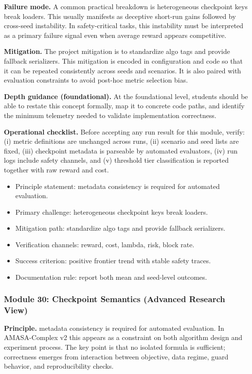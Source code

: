 \documentclass[conference]{IEEEtran}
\begin{document}
\textbf{Failure mode.} A common practical breakdown is heterogeneous checkpoint keys break loaders. This usually manifests as deceptive short-run gains followed by cross-seed instability. In safety-critical tasks, this instability must be interpreted as a primary failure signal even when average reward appears competitive.

\textbf{Mitigation.} The project mitigation is to standardize algo tags and provide fallback serializers. This mitigation is encoded in configuration and code so that it can be repeated consistently across seeds and scenarios. It is also paired with evaluation constraints to avoid post-hoc metric selection bias.

\textbf{Depth guidance (foundational).} At the foundational level, students should be able to restate this concept formally, map it to concrete code paths, and identify the minimum telemetry needed to validate implementation correctness.

\textbf{Operational checklist.} Before accepting any run result for this module, verify: (i) metric definitions are unchanged across runs, (ii) scenario and seed lists are fixed, (iii) checkpoint metadata is parseable by automated evaluators, (iv) run logs include safety channels, and (v) threshold tier classification is reported together with raw reward and cost.

\begin{itemize}[leftmargin=*]
  \item Principle statement: metadata consistency is required for automated evaluation.
  \item Primary challenge: heterogeneous checkpoint keys break loaders.
  \item Mitigation path: standardize algo tags and provide fallback serializers.
  \item Verification channels: reward, cost, lambda, risk, block rate.
  \item Success criterion: positive frontier trend with stable safety traces.
  \item Documentation rule: report both mean and seed-level outcomes.
\end{itemize}


\subsubsection{Module 30: Checkpoint Semantics (Advanced Research View)}
\textbf{Principle.} metadata consistency is required for automated evaluation. In AMASA-Complex v2 this appears as a constraint on both algorithm design and experiment process. The key point is that no isolated formula is sufficient; correctness emerges from interaction between objective, data regime, guard behavior, and reproducibility checks.
\end{document}
